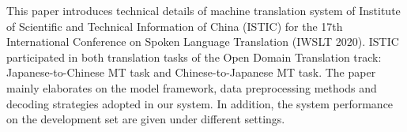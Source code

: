 This paper introduces technical details of machine translation system of Institute of Scientific and Technical Information of China (ISTIC) for the 17th International Conference on Spoken Language Translation (IWSLT 2020). ISTIC participated in both translation tasks of the Open Domain Translation track: Japanese-to-Chinese MT task and Chinese-to-Japanese MT task. The paper mainly elaborates on the model framework, data preprocessing methods and decoding strategies adopted in our system. In addition, the system performance on the development set are given under different settings.
